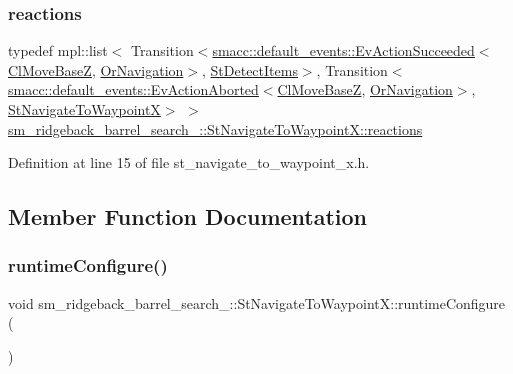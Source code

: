 \subsubsection{\texorpdfstring{reactions}{reactions}}
{\footnotesize\ttfamily typedef mpl\+::list$<$ Transition$<$\hyperlink{structsmacc_1_1default__events_1_1EvActionSucceeded}{smacc\+::default\+\_\+events\+::\+Ev\+Action\+Succeeded}$<$\hyperlink{classcl__move__base__z_1_1ClMoveBaseZ}{Cl\+Move\+BaseZ}, \hyperlink{classsm__ridgeback__barrel__search__2_1_1OrNavigation}{Or\+Navigation}$>$, \hyperlink{structsm__ridgeback__barrel__search__2_1_1StDetectItems}{St\+Detect\+Items}$>$, Transition$<$\hyperlink{structsmacc_1_1default__events_1_1EvActionAborted}{smacc\+::default\+\_\+events\+::\+Ev\+Action\+Aborted}$<$\hyperlink{classcl__move__base__z_1_1ClMoveBaseZ}{Cl\+Move\+BaseZ}, \hyperlink{classsm__ridgeback__barrel__search__2_1_1OrNavigation}{Or\+Navigation}$>$, \hyperlink{structsm__ridgeback__barrel__search__2_1_1StNavigateToWaypointX}{St\+Navigate\+To\+WaypointX}$>$ $>$ \hyperlink{structsm__ridgeback__barrel__search__2_1_1StNavigateToWaypointX_a801d5488fab09c21cda6f5fbc0840d36}{sm\+\_\+ridgeback\+\_\+barrel\+\_\+search\+\_\+::\+St\+Navigate\+To\+Waypoint\+X\+::reactions}}



Definition at line 15 of file st\+\_\+navigate\+\_\+to\+\_\+waypoint\+\_\+x.\+h.



\subsection{Member Function Documentation}
\mbox{\label{structsm__ridgeback__barrel__search__2_1_1StNavigateToWaypointX_a61fb3f74e838edc891a2768b5e6ba98d}} 
\subsubsection{\texorpdfstring{runtime\+Configure()}{runtimeConfigure()}}
{\footnotesize\ttfamily void sm\+\_\+ridgeback\+\_\+barrel\+\_\+search\+\_\+::\+St\+Navigate\+To\+Waypoint\+X\+::runtime\+Configure (\begin{DoxyParamCaption}{ }\end{DoxyParamCaption})\hspace{0.3cm}{\ttfamily [inline]}}



